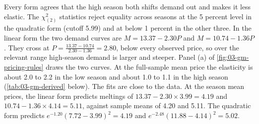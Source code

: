 Every form agrees that the high season both shifts demand out and makes it less elastic. The
$\chi^2_{(2)}$ statistics reject equality across seasons at the 5 percent level in the quadratic form
(cutoff 5.99) and at below 1 percent in the other three. In the linear form the two demand curves are
$M = 13.37 - 2.30P$ and $M = 10.74 - 1.36P$. They cross at $P = \frac{13.37 - 10.74}{2.30 - 1.36} = 2.80$,
below every observed price, so over the relevant range high-season demand is larger and steeper. Panel (a) of
\cref{fig:03-gm-pricing-rules} draws the two curves. At the full-sample mean price the elasticity is about
2.0 to 2.2 in the low season and about 1.0 to 1.1 in the high season (\cref{tab:03-gm-derived} below). The
fits are close to the data. At the season mean prices, the linear form predicts meltings of
$13.37 - 2.30 \times 3.99 = 4.19$ and $10.74 - 1.36 \times 4.14 = 5.11$, against sample means of 4.20 and
5.11. The quadratic form predicts $e^{-1.20}(7.72 - 3.99)^2 = 4.19$ and $e^{-2.48}(11.88 - 4.14)^2 = 5.02$.

